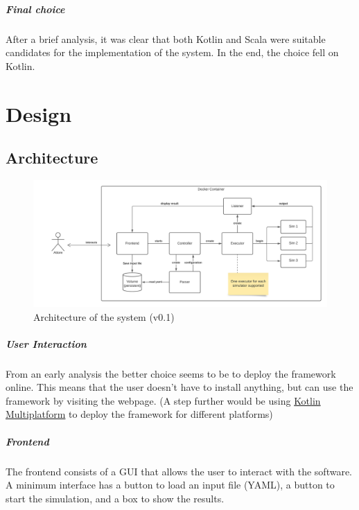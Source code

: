 \documentclass[12pt,a4paper,openright,twoside]{book}
\begin{document}
\paragraph*{Final choice}
After a brief analysis, it was clear that both Kotlin and Scala were suitable candidates for the implementation of the system.
In the end, the choice fell on Kotlin.

\chapter{Design}

\section{Architecture}

\begin{figure}[h]
    \centering
    \includegraphics[width=\textwidth]{figures/architecture.png}
    \caption{Architecture of the system (v0.1)}
    \label{fig:random-image}
\end{figure}

\paragraph*{User Interaction} From an early analysis the better choice seems to be to deploy the framework online.
This means that the user doesn't have to install anything, but can use the framework by visiting the webpage.
(A step further would be using \href{https://kotlinlang.org/docs/multiplatform.html#kotlin-multiplatform-use-cases}{Kotlin Multiplatform} to deploy the framework for different platforms)

\paragraph*{Frontend} The frontend consists of a GUI that allows the user to interact with the software. 
A minimum interface has a button to load an input file (YAML), a button to start the simulation, and a box to show the results.
\end{document}
